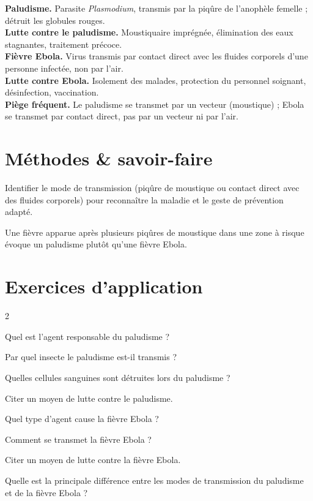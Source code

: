 \begin{synthese}
\textbf{Paludisme.} Parasite \textit{Plasmodium}, transmis par la piqûre de
l'anophèle femelle ; détruit les globules rouges.\\[4pt]
\textbf{Lutte contre le paludisme.} Moustiquaire imprégnée, élimination des eaux
stagnantes, traitement précoce.\\[4pt]
\textbf{Fièvre Ebola.} Virus transmis par contact direct avec les fluides corporels
d'une personne infectée, non par l'air.\\[4pt]
\textbf{Lutte contre Ebola.} Isolement des malades, protection du personnel
soignant, désinfection, vaccination.\\[4pt]
\textbf{Piège fréquent.} Le paludisme se transmet par un vecteur (moustique) ;
Ebola se transmet par contact direct, pas par un vecteur ni par l'air.
\end{synthese}

\section{Méthodes \& savoir-faire}

Identifier le mode de transmission (piqûre de moustique ou contact direct avec des
fluides corporels) pour reconnaître la maladie et le geste de prévention adapté.
\begin{exemple}
Une fièvre apparue après plusieurs piqûres de moustique dans une zone à risque évoque
un paludisme plutôt qu'une fièvre Ebola.
\end{exemple}

\section{Exercices d'application}
\begin{multicols}{2}

\exo{} Quel est l'agent responsable du paludisme ?

\exo{} Par quel insecte le paludisme est-il transmis ?

\exo{} Quelles cellules sanguines sont détruites lors du paludisme ?

\exo{} Citer un moyen de lutte contre le paludisme.

\exo{} Quel type d'agent cause la fièvre Ebola ?

\exo{} Comment se transmet la fièvre Ebola ?

\exo{} Citer un moyen de lutte contre la fièvre Ebola.

\exo{} Quelle est la principale différence entre les modes de transmission du
paludisme et de la fièvre Ebola ?

\end{multicols}

